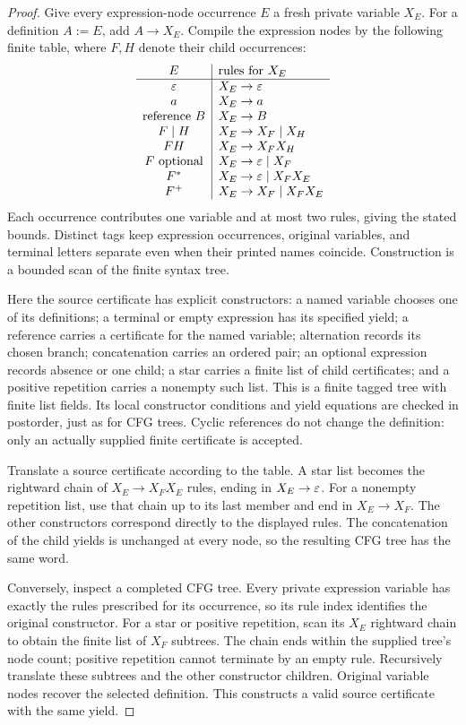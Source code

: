\begin{proof}
Give every expression-node occurrence $E$ a fresh private variable $X_E$.
For a definition $A:=E$, add $A\to X_E$.  Compile the expression nodes by
the following finite table, where $F,H$ denote their child occurrences:
\[
\begin{array}{c|l}
 E & \text{rules for }X_E\\ \hline
 \varepsilon & X_E\to\varepsilon\\
 a & X_E\to a\\
 \text{reference }B & X_E\to B\\
 F\mid H & X_E\to X_F\mid X_H\\
 FH & X_E\to X_FX_H\\
 F\text{ optional} & X_E\to\varepsilon\mid X_F\\
 F^* & X_E\to\varepsilon\mid X_FX_E\\
 F^+ & X_E\to X_F\mid X_FX_E
\end{array}
\]
Each occurrence contributes one variable and at most two rules, giving
the stated bounds.  Distinct tags keep expression occurrences, original
variables, and terminal letters separate even when their printed names
coincide.  Construction is a bounded scan of the finite syntax tree.

Here the source certificate has explicit constructors: a named variable
chooses one of its definitions; a terminal or empty expression has its
specified yield; a reference carries a certificate for the named variable;
alternation records its chosen branch; concatenation carries an ordered
pair; an optional expression records absence or one child; a star carries
a finite list of child certificates; and a positive repetition carries
a nonempty such list.  This is a finite tagged tree with finite list
fields.  Its local constructor conditions and yield equations are checked
in postorder, just as for CFG trees.  Cyclic references do not change the
definition: only an actually supplied finite certificate is accepted.

Translate a source certificate according to the table.  A star list
becomes the rightward chain of $X_E\to X_FX_E$ rules, ending in
$X_E\to\varepsilon$.  For a nonempty repetition list, use that chain up to its
last member and end in $X_E\to X_F$.  The other constructors correspond
directly to the displayed rules.  The concatenation of the child yields
is unchanged at every node, so the resulting CFG tree has the same word.

Conversely, inspect a completed CFG tree.  Every private expression
variable has exactly the rules prescribed for its occurrence, so its
rule index identifies the original constructor.  For a star or positive
repetition, scan its $X_E$ rightward chain to obtain the finite list of
$X_F$ subtrees.  The chain ends within the supplied tree's node count;
positive repetition cannot terminate by an empty rule.  Recursively
translate these subtrees and the other constructor children.  Original
variable nodes recover the selected definition.  This constructs a valid
source certificate with the same yield.


\end{proof}
